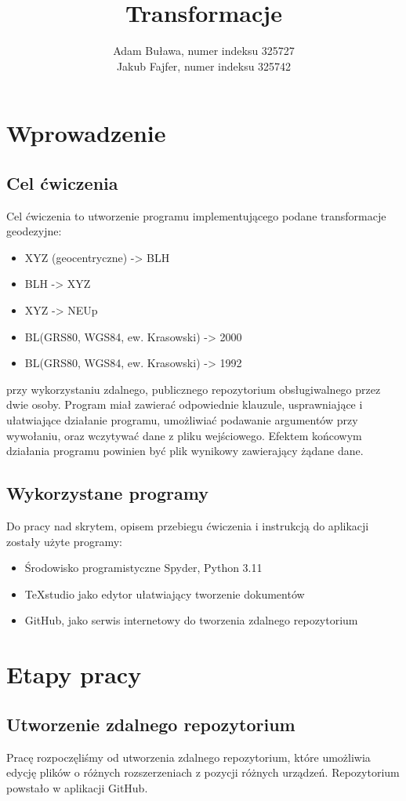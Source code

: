 \documentclass[10pt,a4paper]{article}
\title{Transformacje}
\author{Adam Buława, numer indeksu 325727 \\ Jakub Fajfer, numer indeksu 325742}
\begin{document}
\tableofcontents
\newpage	
\section{Wprowadzenie}

\subsection{Cel ćwiczenia}
Cel ćwiczenia to utworzenie programu implementującego podane transformacje geodezyjne:
\begin{itemize}
	\item XYZ (geocentryczne) -> BLH
	\item  BLH -> XYZ 
	\item  XYZ -> NEUp
	\item  BL(GRS80, WGS84, ew. Krasowski) -> 2000 
	\item  BL(GRS80, WGS84, ew. Krasowski) -> 1992
\end{itemize}
przy wykorzystaniu zdalnego, publicznego repozytorium obsługiwalnego przez dwie osoby. Program miał zawierać odpowiednie klauzule, usprawniające i ułatwiające działanie programu, umożliwiać podawanie argumentów przy wywołaniu, oraz wczytywać dane z pliku wejściowego. Efektem końcowym działania programu powinien być plik wynikowy zawierający żądane dane.
\subsection{Wykorzystane programy}
Do pracy nad skrytem, opisem przebiegu ćwiczenia i instrukcją do aplikacji zostały użyte programy:
\begin{itemize}
	\item Środowisko programistyczne Spyder, Python 3.11
	\item TeXstudio jako edytor ułatwiający tworzenie dokumentów
	\item GitHub, jako serwis internetowy do tworzenia zdalnego repozytorium
\end{itemize}
\section{Etapy pracy}
\subsection{Utworzenie zdalnego repozytorium}
Pracę rozpoczęliśmy od utworzenia zdalnego repozytorium, które umożliwia edycję plików o różnych rozszerzeniach z pozycji różnych urządzeń. Repozytorium powstało w aplikacji GitHub.
\end{document}
